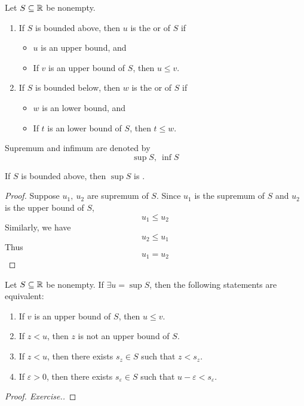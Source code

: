 \documentclass[a4paper,12pt]{article}
\begin{document}
\begin{definition}
    Let \(S\subseteq\mathbb{R}\) be nonempty.
    \begin{enumerate}
        \item If \(S\) is bounded above, then \(u\) is the  or  of \(S\) if 
        \begin{itemize}
            \item \(u\) is an upper bound, and
            \item If \(v\) is an upper bound of \(S\), then \(u\le v\).
        \end{itemize}
        \item If \(S\) is bounded below, then \(w\) is the  or  of \(S\) if 
        \begin{itemize}
            \item \(w\) is an lower bound, and
            \item If \(t\) is an lower bound of \(S\), then \(t\le w\).
        \end{itemize}
    \end{enumerate}
    Supremum and infimum are denoted by 
    \[\sup S,\ \inf S\] 
\end{definition}

\begin{proposition}
    If \(S\) is bounded above, then \(\sup S\) is .
    \begin{proof}
        Suppose \(u_1,\ u_2\) are supremum of \(S\). Since \(u_1\) is the supremum of \(S\) and  \(u_2\) is the upper bound of \(S\), 
        \[u_1\le u_2\]
        Similarly, we have 
        \[u_2\le u_1\]
        Thus 
        \[u_1=u_2\]
    \end{proof}
\end{proposition}

\begin{theorem}
    Let \(S\subseteq\mathbb{R}\) be nonempty. If \(\exists u=\sup S\), then the following statements are equivalent:
    \begin{enumerate}
        \item If \(v\) is an upper bound of \(S\), then \(u\le v\).
        \item If \(z<u\), then \(z\) is not an upper bound of \(S\).
        \item If \(z<u\), then there exists \(s_z\in S\) such that \(z<s_z\).
        \item If \(\varepsilon>0\), then there exists \(s_\varepsilon\in S\) such that \(u-\varepsilon<s_\varepsilon\).\\
    \end{enumerate}
    \begin{proof}[Proof. Exercise.]
        
    \end{proof}
\end{theorem}
\end{document}
